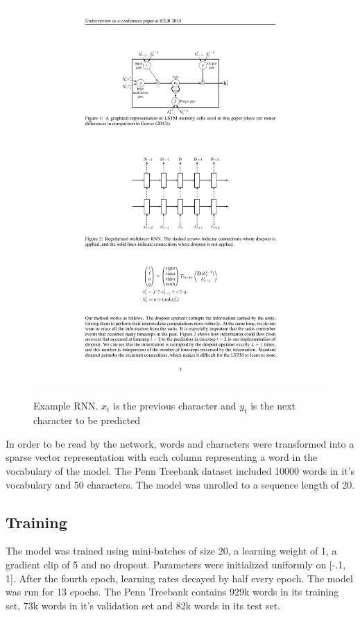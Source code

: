 \documentclass{article} %
\begin{document}
\begin{figure}
	\includegraphics[width=\textwidth]{MultilayerRNN}
        \label{fig2}
        \caption{Example RNN. $x_t$ is the previous character and $y_t$ is the next character to be predicted}
\end{figure}
In order to be read by the network, words and characters were transformed into a sparse vector representation with each column representing a word in the vocabulary of the model. The Penn Treebank dataset included 10000 words in it's vocabulary and 50 characters. The model was unrolled to a sequence length of 20.

\subsection{Training}
The model was trained using mini-batches of size 20, a learning weight of 1, a gradient clip of 5 and no dropout. Parameters were initialized uniformly on [-.1, 1]. After the fourth epoch, learning rates decayed by half every epoch. The model was run for 13 epochs. The Penn Treebank contains 929k words in its training set, 73k words in it's validation set and 82k words in its test set. 
\end{document}
